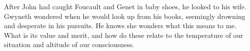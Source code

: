 

After John had caught Foucault and Genet in baby shoes, he looked to
his wife.  Gwyneth wondered when he would look up from his books,
seemingly drowning and desperate in his pursuits.  He knows she
wonders what this means to me.  What is its value and merit, and how
do these relate to the temperature of our situation and altitude of
our consciousness.

\bye
